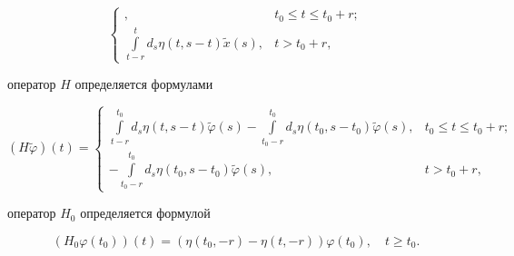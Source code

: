 \begin{assrts}
\begin{equation}
\begin{cases}
, & t_{0}\leq t\leq t_{0}+r;\\


\int\limits_{t-r}^{t}d_{s}\eta (t,s-t) \widetilde{x} (s)


, & t>t_{0}+r,


\end{cases}


\label{oper_D}


\end{equation}


оператор $H$ определяется формулами


\begin{equation}


(H\widetilde{\varphi}) (t)=


\begin{cases}


\int\limits_{t-r}^{t_{0}}d_{s}\eta (t,s-t) \widetilde{\varphi} (


s) -\int\limits_{t_{0}-r}^{t_{0}}d_{s}\eta (t_{0},s-t_{0})


\widetilde{\varphi} (s), & t_{0}\leq t\leq t_{0}+r;\\


-\int\limits_{t_{0}-r}^{t_{0}}d_{s}\eta (t_{0},s-t_{0}) \widetilde


{\varphi} (s), & t>t_{0}+r,


\end{cases}


\label{oper_H}


\end{equation}


оператор $H_{0}$ определяется формулой


\begin{equation}


(H_{0}\varphi (t_{0})) (t)=(


\eta (t_{0},-r) -\eta (t,-r)) \varphi (


t_{0}),\quad t\geq t_{0}.\label{oper_H_0}


\end{equation}


\end{assrts}





